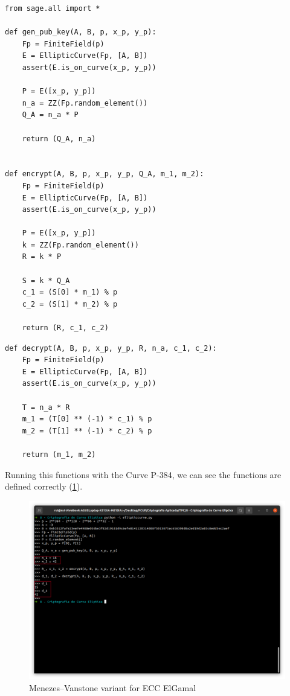 \documentclass[a4paper]{article}
\begin{document}
\begin{verbatim}
from sage.all import *

def gen_pub_key(A, B, p, x_p, y_p):
    Fp = FiniteField(p)
    E = EllipticCurve(Fp, [A, B])
    assert(E.is_on_curve(x_p, y_p))

    P = E([x_p, y_p])
    n_a = ZZ(Fp.random_element())
    Q_A = n_a * P

    return (Q_A, n_a)


def encrypt(A, B, p, x_p, y_p, Q_A, m_1, m_2):
    Fp = FiniteField(p)
    E = EllipticCurve(Fp, [A, B])
    assert(E.is_on_curve(x_p, y_p))

    P = E([x_p, y_p])
    k = ZZ(Fp.random_element())
    R = k * P

    S = k * Q_A
    c_1 = (S[0] * m_1) % p
    c_2 = (S[1] * m_2) % p

    return (R, c_1, c_2)
\end{verbatim}

\begin{verbatim}
def decrypt(A, B, p, x_p, y_p, R, n_a, c_1, c_2):
    Fp = FiniteField(p)
    E = EllipticCurve(Fp, [A, B])
    assert(E.is_on_curve(x_p, y_p))

    T = n_a * R
    m_1 = (T[0] ** (-1) * c_1) % p
    m_2 = (T[1] ** (-1) * c_2) % p

    return (m_1, m_2)
\end{verbatim}

\vspace{2\baselineskip}

Running this functions with the Curve P-384, we can see the functions are defined
correctly (\cref{fig:sage}).

\vspace{\baselineskip}

\begin{figure}[H]
    \centering
    \includegraphics[width=\textwidth]{img/ex2.png}
    \caption{Menezes–Vanstone variant for ECC ElGamal}
    \label{fig:sage}
\end{figure}
\end{document}
